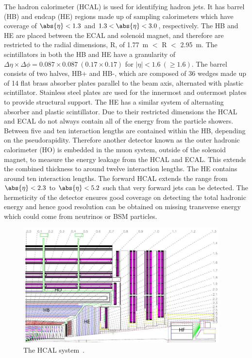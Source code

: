 The hadron calorimeter (HCAL) is used for identifying hadron jets. It has barrel (HB) and endcap (HE) regions made up of sampling calorimeters which have coverage of $\abs{\eta}<1.3$ and $1.3<\abs{\eta}<3.0$, respectively. The HB and HE are placed between the ECAL and solenoid magnet, and therefore are restricted to the radial dimensions, R, of 1.77~m $<$ R $<$ 2.95~m. The scintillators in both the HB and HE have a granularity of $\Delta\eta \times \Delta\phi = 0.087 \times 0.087~(0.17 \times 0.17)$ for $|\eta|<1.6~(\geq1.6)$. The barrel consists of two halves, HB+ and HB-, which are composed of 36 wedges made up of 14 flat brass absorber plates parallel to the beam axis, alternated with plastic scintillator. Stainless steel plates are used for the innermost and outermost plates to provide structural support. The HE has a similar system of alternating absorber and plastic scintillator.
Due to their restricted dimensions the HCAL and ECAL do not always contain all of the energy from the particle showers. Between five and ten interaction lengths are contained within the HB, depending on the pseudorapidity. Therefore another detector known as the outer hadronic calorimeter (HO) is embedded in the muon system, outside of the solenoid magnet, to measure the energy leakage from the HCAL and ECAL. This extends the combined thickness to around twelve interaction lengths. The HE contains around ten interaction lengths.
The forward HCAL extends the range from $\abs{\eta}<2.3$ to $\abs{\eta}<5.2$ such that very forward jets can be detected. The hermeticity of the detector ensures good coverage on detecting the total hadronic energy and hence good resolution can be obtained on missing transverse energy which could come from neutrinos or BSM particles. 

\begin{figure}[ht!]
\centering
    \includegraphics[width=0.95\textwidth]{images/HCAL.png}
    \caption{The HCAL system~\cite{Isildak:2013kfa}.}
    \label{fig:hcal}
\end{figure}

